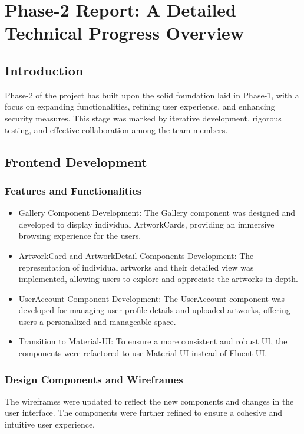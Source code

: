 \documentclass[11pt]{article}
\author{Cthulhu}
\date{\today}
\title{}
\begin{document}
\tableofcontents

\section{Phase-2 Report: A Detailed Technical Progress Overview}
\label{sec:org9955a15}

\subsection{Introduction}
\label{sec:org9df2788}

Phase-2 of the project has built upon the solid foundation laid in Phase-1, with
a focus on expanding functionalities, refining user experience, and enhancing
security measures. This stage was marked by iterative development, rigorous
testing, and effective collaboration among the team members. 

\subsection{Frontend Development}
\label{sec:org056e427}

\subsubsection{Features and Functionalities}
\label{sec:orgf1f15f2}
\begin{itemize}
\item Gallery Component Development: The Gallery component was designed and
developed to display individual ArtworkCards, providing an immersive
browsing experience for the users.
\item ArtworkCard and ArtworkDetail Components Development: The representation
of individual artworks and their detailed view was implemented, allowing
users to explore and appreciate the artworks in depth.
\item UserAccount Component Development: The UserAccount component was developed
for managing user profile details and uploaded artworks, offering users a
personalized and manageable space.
\item Transition to Material-UI: To ensure a more consistent and robust UI, the
components were refactored to use Material-UI instead of Fluent UI.
\end{itemize}

\subsubsection{Design Components and Wireframes}
\label{sec:org521d13a}
The wireframes were updated to reflect the new components and changes in the
user interface. The components were further refined to ensure a cohesive and
intuitive user experience. 
\end{document}
